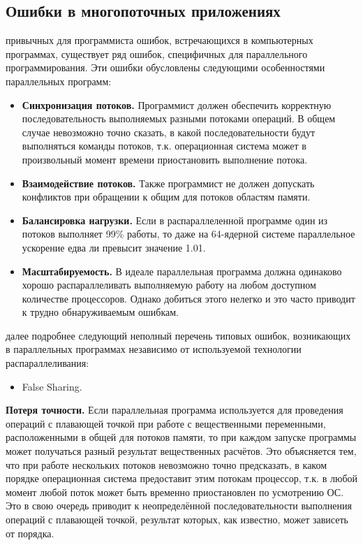 { %
	\subsection{Ошибки в многопоточных приложениях}
	 привычных для программиста ошибок, встречающихся в компьютерных программах, существует ряд ошибок, специфичных для параллельного программирования. Эти ошибки обусловлены следующими особенностями параллельных программ: 
	\begin{itemize}
		\item\textbf{Синхронизация потоков.} Программист должен обеспечить корректную последовательность выполняемых разными потоками операций. В общем случае невозможно точно сказать, в какой последовательности будут выполняться команды потоков, т.к. операционная система может в произвольный момент времени приостановить выполнение потока.
		\item\textbf{Взаимодействие потоков.} Также программист не должен допускать конфликтов при обращении к общим для потоков областям памяти. 
		\item\textbf{Балансировка нагрузки.} Если в распараллеленной программе один из потоков выполняет 99\% работы, то даже на 64-ядерной системе параллельное ускорение едва ли превысит значение 1.01.
		\item\textbf{Масштабируемость.} В идеале параллельная программа должна одинаково хорошо распараллеливать выполняемую работу на любом доступном количестве процессоров. Однако добиться этого нелегко и это часто приводит к трудно обнаруживаемым ошибкам.
	\end{itemize}
	 далее подробнее следующий неполный перечень типовых ошибок, возникающих в параллельных программах независимо от используемой технологии распараллеливания:
	\begin{itemize}
		 точности операций с плавающей точкой.
		 блокировки (deadlock).
		 гонки (race conditions). 
		 АВА.
		 приоритетов.
		(starvation).
		\item False Sharing.
	\end{itemize}
	\par\textbf{Потеря точности.} Если параллельная программа используется для проведения операций с плавающей точкой при работе с вещественными переменными, расположенными в общей для потоков памяти, то при каждом запуске программы может получаться разный результат вещественных расчётов. Это объясняется тем, что при работе нескольких потоков невозможно точно предсказать, в каком порядке операционная система предоставит этим потокам процессор, т.к. в любой момент любой поток может быть временно приостановлен по усмотрению ОС. Это в свою очередь приводит к неопределённой последовательности выполнения операций с плавающей точкой, результат которых, как известно, может зависеть от порядка.
}
